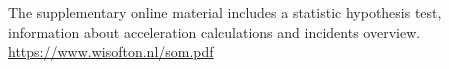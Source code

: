 The supplementary online material includes a statistic hypothesis test, information about acceleration calculations and incidents overview. \url{https://www.wisofton.nl/som.pdf}
